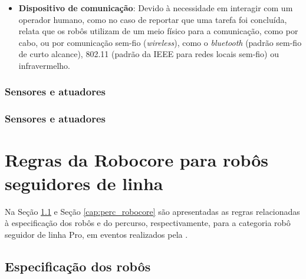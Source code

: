 \begin{itemize}
\item[] \textbf{Dispositivo de comunicação}: Devido à necessidade em interagir com um operador humano, como no caso de reportar que 
uma tarefa foi concluída,  relata que os robôs utilizam de um meio físico para a comunicação, como por cabo, ou 
por comunicação sem-fio (\textit{wireless}), como o \textit{bluetooth} (padrão sem-fio de curto alcance), 802.11 (padrão da IEEE 
 para redes locais sem-fio) ou infravermelho.
















\end{itemize}













\subsubsection{Sensores e atuadores}
\subsubsection{Sensores e atuadores}



\vspace{1cm}
\section{Regras da Robocore para robôs seguidores de linha} \label{cap:regras_comp}

Na Seção \ref{cap:espc_robocore} e Seção \ref{cap:perc_robocore} são apresentadas as regras relacionadas à 
especificação dos robôs e do percurso, respectivamente, 
para a categoria robô seguidor de linha Pro, em eventos realizados pela .

\vspace{1cm}
\subsection{Especificação dos robôs} \label{cap:espc_robocore}

